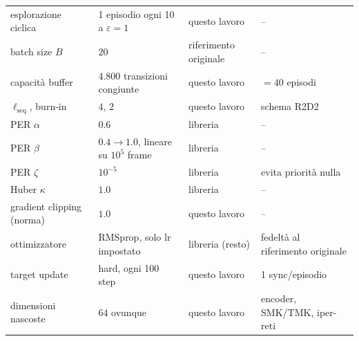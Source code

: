\begin{table}[htbp]
\begin{tabular}{@{}p{3.2cm}p{2.9cm}p{2.9cm}p{4.3cm}@{}}
    esplorazione ciclica         & 1 episodio ogni 10 a $\varepsilon=1$                                & questo lavoro         & --                                                             \\
    batch size $B$               & $20$                                                                & riferimento originale & --                                                             \\
    capacità buffer              & $4.800$ transizioni congiunte                                       & questo lavoro         & $= 40$ episodi                                                 \\
    $\ell_{\text{seq}}$, burn-in & $4$, $2$                                                            & questo lavoro         & schema R2D2                                                    \\
    PER $\alpha$                 & $0.6$                                                               & libreria              & --                                                             \\
    PER $\beta$                  & $0.4 \to 1.0$, lineare su $10^5$ frame                              & libreria              & --                                                             \\
    PER $\zeta$                  & $10^{-5}$                                                           & libreria              & evita priorità nulla                                           \\
    Huber $\kappa$               & $1.0$                                                               & libreria              & --                                                             \\
    gradient clipping (norma)    & $1.0$                                                               & questo lavoro         & --                                                             \\
    ottimizzatore                & RMSprop, solo lr impostato                                          & libreria (resto)      & fedeltà al riferimento originale                               \\
    target update                & hard, ogni 100 step                                                 & questo lavoro         & 1 sync/episodio                                                \\
    dimensioni nascoste          & $64$ ovunque                                                        & questo lavoro         & encoder, SMK/TMK, iper-reti                                    \\

\end{tabular}
\end{table}
